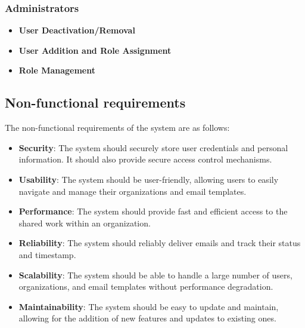 \subsubsection{Administrators}
\begin{itemize}
\item \textbf{User Deactivation/Removal}
\item \textbf{User Addition and Role Assignment}
\item \textbf{Role Management}
\end{itemize}


\subsection{Non-functional requirements}
The non-functional requirements of the system are as follows:
\begin{itemize}
\item \textbf{Security}: The system should securely store user credentials and personal information. It should also provide secure access control mechanisms.
\item \textbf{Usability}: The system should be user-friendly, allowing users to easily navigate and manage their organizations and email templates.
\item \textbf{Performance}: The system should provide fast and efficient access to the shared work within an organization.
\item \textbf{Reliability}: The system should reliably deliver emails and track their status and timestamp.
\item \textbf{Scalability}: The system should be able to handle a large number of users, organizations, and email templates without performance degradation.
\item \textbf{Maintainability}: The system should be easy to update and maintain, allowing for the addition of new features and updates to existing ones.
\end{itemize}
